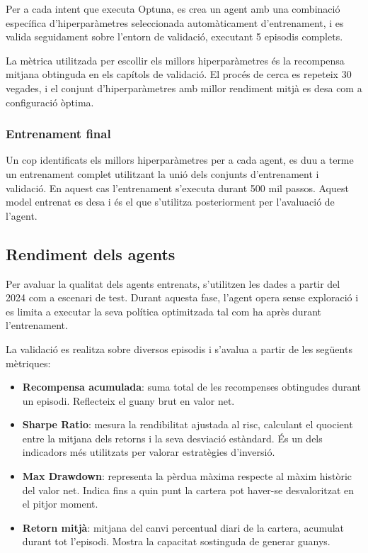 \documentclass[12pt,a4paper,twoside]{book}
\begin{document}
Per a cada intent que executa Optuna, es crea un agent amb una combinació específica d'hiperparàmetres seleccionada automàticament d'entrenament, i es valida seguidament sobre l'entorn de validació, executant 5 episodis complets.

La mètrica utilitzada per escollir els millors hiperparàmetres és la recompensa mitjana obtinguda en els capítols de validació. El procés de cerca es repeteix 30 vegades, i el conjunt d'hiperparàmetres amb millor rendiment mitjà es desa com a configuració òptima.

\subsubsection{Entrenament final}
Un cop identificats els millors hiperparàmetres per a cada agent, es duu a terme un entrenament complet utilitzant la unió dels conjunts d'entrenament i validació. En aquest cas l'entrenament s'executa durant 500 mil passos. Aquest model entrenat es desa i és el que s'utilitza posteriorment per l'avaluació de l'agent.

\subsection{Rendiment dels agents}

Per avaluar la qualitat dels agents entrenats, s'utilitzen les dades a partir del 2024 com a escenari de test. Durant aquesta fase, l'agent opera sense exploració i es limita a executar la seva política optimitzada tal com ha après durant l'entrenament.

La validació es realitza sobre diversos episodis i s'avalua a partir de les següents mètriques:

\begin{itemize}
    \item \textbf{Recompensa acumulada}: suma total de les recompenses obtingudes durant un episodi. Reflecteix el guany brut en valor net.

    \item \textbf{Sharpe Ratio}: mesura la rendibilitat ajustada al risc, calculant el quocient entre la mitjana dels retorns i la seva desviació estàndard. És un dels indicadors més utilitzats per valorar estratègies d'inversió.

    \item \textbf{Max Drawdown}: representa la pèrdua màxima respecte al màxim històric del valor net. Indica fins a quin punt la cartera pot haver-se desvaloritzat en el pitjor moment.

    \item \textbf{Retorn mitjà}: mitjana del canvi percentual diari de la cartera, acumulat durant tot l'episodi. Mostra la capacitat sostinguda de generar guanys.
\end{itemize}
\end{document}
